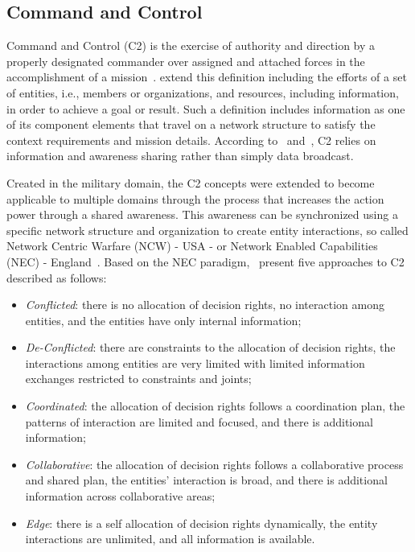 \subsection{Command and Control}
\label{ssec:background_c2}

Command and Control (C2) is the exercise of authority and direction by a properly designated commander over assigned and attached forces in the accomplishment of a mission~\citep{dod01}. \citet{Alberts2006} \color{black}extend \color{black} this definition including the efforts of a set of entities, i.e., members or organizations, and resources, including information, in order to achieve a goal or result. Such a definition includes information as one of its component elements that travel on a network structure \color{black}to satisfy \color{black} the context requirements and mission details. According to~\citet{Stanton2007} and~\citet{Mason2001}, C2 relies on information and awareness sharing rather than simply data broadcast. 

Created in the military domain, the C2 concepts were extended to become applicable  to multiple domains through the process that increases the action power through a shared awareness. This awareness can be synchronized using a specific network structure and organization \color{black} to create entity interactions, \color{black} so called Network Centric Warfare (NCW) - USA -  or Network Enabled Capabilities (NEC) - England~\citep{Alberts2000}. \color{black} Based on the NEC paradigm,~\citet{FRANCE2014,nato01} present five approaches to C2 described as follows:
\begin{itemize}
    \item \textit{Conflicted}: there is no allocation of decision rights, no interaction among entities, and the entities have only internal information; 

    \item \textit{De-Conflicted}: there are constraints to the allocation of decision rights, the interactions among entities are very limited with limited information exchanges restricted to constraints and joints;

    \item \textit{Coordinated}: the allocation of decision rights follows a coordination plan, the patterns of interaction are limited and focused, and there is additional information;

    \item \textit{Collaborative}: the allocation of decision rights follows a collaborative process and shared plan, the entities’ interaction is broad, and there is additional information across collaborative areas;

    \item \textit{Edge}: there is a self allocation of decision rights dynamically, the entity interactions are unlimited, and all information is available.
\end{itemize}
\color{black}

